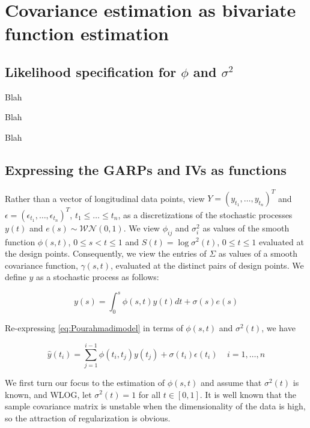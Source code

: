 \section{Covariance estimation as bivariate function estimation}
 
\subsection{Likelihood specification for $\phi$ and $\sigma^2$} 
 
 Blah 
 
 Blah 
 
 Blah
 
\subsection{Expressing the GARPs and IVs as functions}
 
Rather than a vector of longitudinal data points, view $Y = \left(y_{t_1}, \dots, y_{t_n}\right)^T$ and $\epsilon = \left(\epsilon_{t_1}, \dots, \epsilon_{t_n}\right)^T$, ${t_1} \le \dots \le {t_n}$, as a discretizations of the stochastic processes $y\left(t\right)$ and $e\left(s\right) \sim \mathcal{WN}\left(0,1\right)$.  We view $\phi_{ij}$ and $\sigma_i^2$ as values of the smooth function $\phi\left(s,t\right)$, $0 \le s < t \le 1$ and $S\left(t\right) = \log \sigma^2\left(t \right)$, $0 \le t \le 1$ evaluated at the design points. Consequently, we view the entries of $\Sigma$ as values of a smooth covariance function, $\gamma\left(s,t\right)$, evaluated at the distinct pairs of design points. We define $y$ as a stochastic process as follows:

 \begin{equation}
 y\left(s\right) = \int_0^s \phi\left(s,t\right)y\left(t\right)dt + \sigma\left(s\right)e\left(s\right)
 \end{equation}
 
Re-expressing \eqref{eq:Pourahmadimodel} in terms of $\phi\left(s,t\right)$ and $\sigma^2\left(t\right)$, we have

   \begin{equation}   
   \hat{y}\left(t_i\right)  = \sum_{j=1}^{i-1} \phi\left(t_i ,t_j\right) y\left({t_j}\right) + \sigma\left(t_i\right)\epsilon\left({t_i}\right) \;\;\;\; i=1,\dots, n 
   \label{eq:MyModel} 
   \end{equation}

We first turn our focus to the estimation of $\phi\left(s,t\right)$ and assume that $\sigma^2\left(t\right)$ is known, and WLOG, let $\sigma^2\left(t\right) = 1$ for all $t \in \left[0,1\right]$. It is well known that the sample covariance matrix is unstable when the dimensionality of the data is high, so the attraction of regularization is obvious. 

